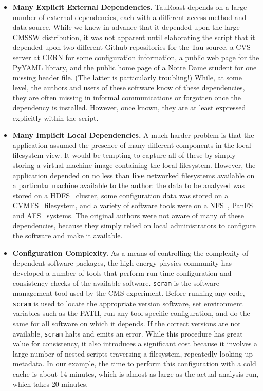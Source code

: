 \documentclass{sig-alternate}
\begin{document}
\begin{itemize}

\item {\bf Many Explicit External Dependencies.}  TauRoast depends on a large number of
external dependencies, each with a different access method and data source.
While we knew in advance that it depended upon the large CMSSW distribution,
it was not apparent until elaborating the script that it depended upon
two different Github repositories for the Tau source,
a CVS server at CERN for some configuration information, a public web page
for the PyYAML library, and the public home page of a Notre Dame student
for one missing header file.  (The latter is particularly troubling!)
While, at some level, the authors and users of these software know of these dependencies, they are often missing in
informal communications or forgotten once the dependency is installed.
However, once known, they are at least expressed explicitly within the script.

\item {\bf Many Implicit Local Dependencies.} A much harder problem is that the
application assumed the presence of many different components in the local
filesystem view. It would be tempting to capture all of these by simply
storing a virtual machine image containing the local filesystem. However,
the application depended on no less than {\bf five} networked filesystems
available on a particular machine available to the author:
the data to be analyzed was stored on a HDFS~\cite{borthakur2008hdfs} cluster,
some configuration data was stored on a CVMFS~\cite{blomer2011cernvm} filesystem,
and a variety of software tools were on a NFS~\cite{howard1988scale},
PanFS~\cite{welch2008scalable} and AFS~\cite{sandberg1985design} systems.
The original authors were not aware of many of these dependencies,
because they simply relied on local administrators to configure the
software and make it available.

\item {\bf Configuration Complexity.}  As a means of controlling the complexity
of dependent software packages, the high energy physics community has developed
a number of tools that perform run-time configuration and consistency checks
of the available software.  {\tt scram} is the software management tool used
by the CMS experiment.  Before running any code, {\tt scram} is used to locate
the appropriate version software,  set environment variables such as the PATH, run any
tool-specific configuration, and do the same for all software on which it depends.
If the correct versions are not available, {\tt scram} halts and emits an error.
While this procedure has great value for consistency, it also introduces a significant cost
because it involves a large number of nested scripts traversing a filesystem,
repeatedly looking up metadata.  In our example, the time to perform this configuration
with a cold cache is about 14 minutes, which is almost as large as the actual analysis
run, which takes 20 minutes.


\end{itemize}
\end{document}
